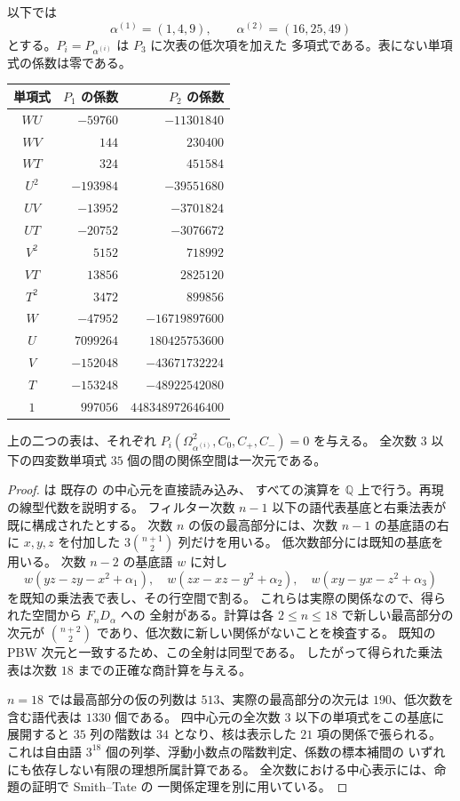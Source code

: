 以下では
\[
 \alpha^{(1)}=(1,4,9),\qquad
 \alpha^{(2)}=(16,25,49)
\]
とする。$P_i=P_{\alpha^{(i)}}$ は $P_3$ に次表の低次項を加えた
多項式である。表にない単項式の係数は零である。
\begin{center}
\small
\begin{tabular}{c|r|r}
単項式 & $P_1$ の係数 & $P_2$ の係数\\ \hline
$WU$ & $-59760$ & $-11301840$\\
$WV$ & $144$ & $230400$\\
$WT$ & $324$ & $451584$\\
$U^2$ & $-193984$ & $-39551680$\\
$UV$ & $-13952$ & $-3701824$\\
$UT$ & $-20752$ & $-3076672$\\
$V^2$ & $5152$ & $718992$\\
$VT$ & $13856$ & $2825120$\\
$T^2$ & $3472$ & $899856$\\
$W$ & $-47952$ & $-16719897600$\\
$U$ & $7099264$ & $180425753600$\\
$V$ & $-152048$ & $-43671732224$\\
$T$ & $-153248$ & $-48922542080$\\
$1$ & $997056$ & $448348972646400$
\end{tabular}
\end{center}

\begin{lemma}[有限計算による関係の証明]
\label{cmo:lem:center-relation-certificate}
上の二つの表は、それぞれ
$P_i(\Omega_{\alpha^{(i)}}^2,C_0,C_+,C_-)=0$ を与える。
全次数 $3$ 以下の四変数単項式 $35$ 個の間の関係空間は一次元である。
\end{lemma}

\begin{proof}
 は
既存の  の中心元を直接読み込み、
すべての演算を $\mathbb Q$ 上で行う。再現の線型代数を説明する。
フィルター次数 $n-1$ 以下の語代表基底と右乗法表が既に構成されたとする。
次数 $n$ の仮の最高部分には、次数 $n-1$ の基底語の右に
$x,y,z$ を付加した $3\binom{n+1}{2}$ 列だけを用いる。
低次数部分には既知の基底を用いる。
次数 $n-2$ の基底語 $w$ に対し
\[
 w(yz-zy-x^2+\alpha_1),\quad
 w(zx-xz-y^2+\alpha_2),\quad
 w(xy-yx-z^2+\alpha_3)
\]
を既知の乗法表で表し、その行空間で割る。
これらは実際の関係なので、得られた空間から $F_nD_\alpha$ への
全射がある。計算は各 $2\le n\le18$ で新しい最高部分の次元が
$\binom{n+2}{2}$ であり、低次数に新しい関係がないことを検査する。
既知の PBW 次元と一致するため、この全射は同型である。
したがって得られた乗法表は次数 $18$ までの正確な商計算を与える。

$n=18$ では最高部分の仮の列数は $513$、実際の最高部分の次元は
$190$、低次数を含む語代表は $1330$ 個である。
四中心元の全次数 $3$ 以下の単項式をこの基底に展開すると
$35$ 列の階数は $34$ となり、核は表示した $21$ 項の関係で張られる。
これは自由語 $3^{18}$ 個の列挙、浮動小数点の階数判定、係数の標本補間の
いずれにも依存しない有限の理想所属計算である。
全次数における中心表示には、命題の証明で Smith--Tate の
一関係定理を別に用いている。
\end{proof}

